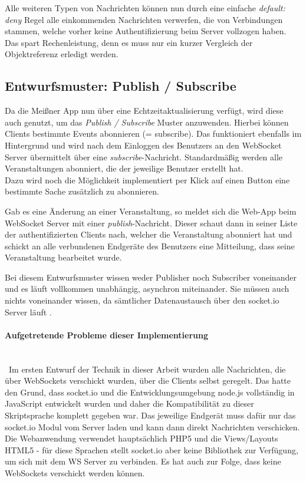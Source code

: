 Alle weiteren Typen von Nachrichten können nun durch eine einfache \emph{default: deny} Regel alle einkommenden Nachrichten verwerfen, die von Verbindungen stammen, welche vorher keine Authentifizierung beim Server vollzogen haben. Das spart Rechenleistung, denn es muss nur ein kurzer Vergleich der Objektreferenz erledigt werden.\par


\subsection{Entwurfsmuster: Publish / Subscribe}
Da die Meißner App nun über eine Echtzeitaktualisierung verfügt, wird diese auch genutzt, um das \emph{Publish / Subscribe} Muster anzuwenden. Hierbei können Clients bestimmte Events abonnieren (= subscribe). Das funktioniert ebenfalls im Hintergrund und wird nach dem Einloggen des Benutzers an den WebSocket Server übermittelt über eine \emph{subscribe}-Nachricht. Standardmäßig werden alle Veranstaltungen abonniert, die der jeweilige Benutzer erstellt hat.\\
Dazu wird noch die Möglichkeit implementiert per Klick auf einen Button eine bestimmte Sache zusätzlich zu abonnieren.\par

Gab es eine Änderung an einer Veranstaltung, so meldet sich die Web-App beim WebSocket Server mit einer \emph{publish}-Nachricht. Dieser schaut dann in seiner Liste der authentifizierten Clients nach, welcher die Veranstaltung abonniert hat und schickt an alle verbundenen Endgeräte des Benutzers eine Mitteilung, dass seine Veranstaltung bearbeitet wurde.\par

Bei diesem Entwurfsmuster wissen weder Publisher noch Subscriber voneinander und es läuft vollkommen unabhängig, asynchron miteinander. Sie müssen auch nichts voneinander wissen, da sämtlicher Datenaustausch über den socket.io Server läuft \cite{autobahn.js:pubsub}.

\paragraph{Aufgetretende Probleme dieser Implementierung}\ \\ \
Im ersten Entwurf der Technik in dieser Arbeit wurden alle Nachrichten, die über WebSockets verschickt wurden, über die Clients selbst geregelt. Das hatte den Grund, dass socket.io und die Entwicklungsumgebung node.js vollständig in JavaScript entwickelt wurden und daher die Kompatibilität zu dieser Skriptsprache komplett gegeben war. Das jeweilige Endgerät muss dafür nur das socket.io Modul vom Server laden und kann dann direkt Nachrichten verschicken.\\
Die Webanwendung verwendet hauptsächlich PHP5 und die Views/Layouts HTML5 - für diese Sprachen stellt socket.io aber keine Bibliothek zur Verfügung, um sich mit dem WS Server zu verbinden. Es hat auch zur Folge, dass keine WebSockets verschickt werden können.\par

